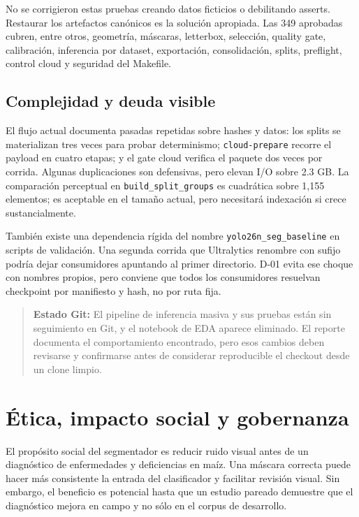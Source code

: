 \documentclass[11pt,a4paper]{article}
\begin{document}
No se corrigieron estas pruebas creando datos ficticios o debilitando asserts. Restaurar los artefactos canónicos es la solución apropiada. Las 349 aprobadas cubren, entre otros, geometría, máscaras, letterbox, selección, quality gate, calibración, inferencia por dataset, exportación, consolidación, splits, preflight, control cloud y seguridad del Makefile.


\subsection{Complejidad y deuda visible}

El flujo actual documenta pasadas repetidas sobre hashes y datos: los splits se materializan tres veces para probar determinismo; \texttt{cloud-prepare} recorre el payload en cuatro etapas; y el gate cloud verifica el paquete dos veces por corrida. Algunas duplicaciones son defensivas, pero elevan I/O sobre 2.3 GB. La comparación perceptual en \texttt{build\_split\_groups} es cuadrática sobre 1,155 elementos; es aceptable en el tamaño actual, pero necesitará indexación si crece sustancialmente.


También existe una dependencia rígida del nombre \texttt{yolo26n\_seg\_baseline} en scripts de validación. Una segunda corrida que Ultralytics renombre con sufijo podría dejar consumidores apuntando al primer directorio. D-01 evita ese choque con nombres propios, pero conviene que todos los consumidores resuelvan checkpoint por manifiesto y hash, no por ruta fija.


\begin{quote}\textbf{Estado Git:} El pipeline de inferencia masiva y sus pruebas están sin seguimiento en Git, y el notebook de EDA aparece eliminado. El reporte documenta el comportamiento encontrado, pero esos cambios deben revisarse y confirmarse antes de considerar reproducible el checkout desde un clone limpio.\end{quote}

\section{Ética, impacto social y gobernanza}

El propósito social del segmentador es reducir ruido visual antes de un diagnóstico de enfermedades y deficiencias en maíz. Una máscara correcta puede hacer más consistente la entrada del clasificador y facilitar revisión visual. Sin embargo, el beneficio es potencial hasta que un estudio pareado demuestre que el diagnóstico mejora en campo y no sólo en el corpus de desarrollo.
\end{document}
